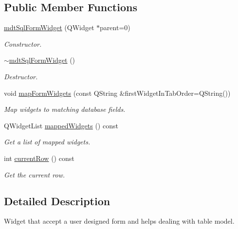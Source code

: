 \subsection*{Public Member Functions}
\begin{DoxyCompactItemize}
\item 
\hypertarget{classmdt_sql_form_widget_a53570f49eac1a7fa490546497c88ad13}{
\hyperlink{classmdt_sql_form_widget_a53570f49eac1a7fa490546497c88ad13}{mdtSqlFormWidget} (QWidget $\ast$parent=0)}
\label{classmdt_sql_form_widget_a53570f49eac1a7fa490546497c88ad13}

\begin{DoxyCompactList}\small\item\em Constructor. \end{DoxyCompactList}\item 
\hypertarget{classmdt_sql_form_widget_a38df8efea5c216ea2b6f047e3280aac5}{
\hyperlink{classmdt_sql_form_widget_a38df8efea5c216ea2b6f047e3280aac5}{$\sim$mdtSqlFormWidget} ()}
\label{classmdt_sql_form_widget_a38df8efea5c216ea2b6f047e3280aac5}

\begin{DoxyCompactList}\small\item\em Destructor. \end{DoxyCompactList}\item 
void \hyperlink{classmdt_sql_form_widget_ace4f7fad749a4efe1233b61d071b3926}{mapFormWidgets} (const QString \&firstWidgetInTabOrder=QString())
\begin{DoxyCompactList}\small\item\em Map widgets to matching database fields. \end{DoxyCompactList}\item 
QWidgetList \hyperlink{classmdt_sql_form_widget_a92648a10dd7e830faca0989007c49b6e}{mappedWidgets} () const 
\begin{DoxyCompactList}\small\item\em Get a list of mapped widgets. \end{DoxyCompactList}\item 
int \hyperlink{classmdt_sql_form_widget_a9588fdc58b30440077b8dcfa3a2fb3c0}{currentRow} () const 
\begin{DoxyCompactList}\small\item\em Get the current row. \end{DoxyCompactList}\end{DoxyCompactItemize}


\subsection{Detailed Description}
Widget that accept a user designed form and helps dealing with table model. 

